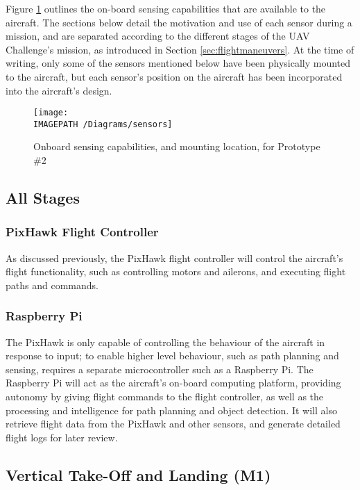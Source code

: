 \label{sec:sensing}
Figure \ref{fig:sensing} outlines the on-board sensing capabilities that are available to the aircraft. The sections below detail the motivation and use of each sensor during a mission, and are separated according to the different stages of the UAV Challenge's mission, as introduced in Section \ref{sec:flightmaneuvers}. At the time of writing, only some of the sensors mentioned below have been physically mounted to the aircraft, but each sensor's position on the aircraft has been incorporated into the aircraft's design.

\begin{figure}[!ht]
	\centering
	\texttt{[image: \\IMAGEPATH /Diagrams/sensors]}
	\caption{Onboard sensing capabilities, and mounting location, for Prototype \#2}
	\label{fig:sensing}
\end{figure}

\subsection{All Stages}

\subsubsection*{PixHawk Flight Controller}
As discussed previously, the PixHawk flight controller will control the aircraft's flight functionality, such as controlling motors and ailerons, and executing flight paths and commands.

\subsubsection*{Raspberry Pi}
The PixHawk is only capable of controlling the behaviour of the aircraft in response to input; to enable higher level behaviour, such as path planning and sensing, requires a separate microcontroller such as a Raspberry Pi. The Raspberry Pi will act as the aircraft's on-board computing platform, providing autonomy by giving flight commands to the flight controller, as well as the processing and intelligence for path planning and object detection. It will also retrieve flight data from the PixHawk and other sensors, and generate detailed flight logs for later review.

\subsection{Vertical Take-Off and Landing (M1)}
